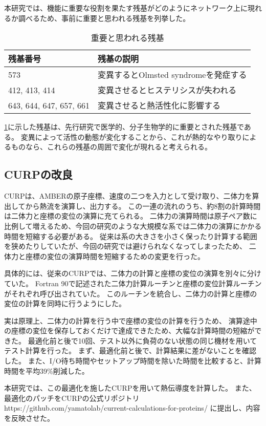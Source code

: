 本研究では、機能に重要な役割を果たす残基がどのようにネットワーク上に現れるか調べるため、事前に重要と思われる残基を列挙した。

\begin{table}[!ht]
  \centering
  \caption{重要と思われる残基}
  \begin{tabular}{ll}
  \hline
      残基番号                & 残基の説明            \\
      \hline
      573                     & 変異するとOlmsted syndromeを発症する\autocite{lin_exome_2012,lai-cheong_recurrent_2012,nilius_trpv_2013} \\
      412, 413, 414           & 変異させるとヒステリシスが失われる\autocite{liu_single-residue_2017} \\
      643, 644, 647, 657, 661 & 変異させると熱活性化に影響する\autocite{grandl_pore_2008} \\
  \end{tabular}
  \label{tab:important_residues}
\end{table}

\ref{tab:important_residues}に示した残基は、先行研究で医学的、分子生物学的に重要とされた残基である。
変異によって活性の動態が変化することから、これが熱的なやり取りによるものなら、これらの残基の周囲で変化が現れると考えられる。

\subsection{CURPの改良}\label{sec:curp}

CURPは、AMBERの原子座標、速度の二つを入力として受け取り、二体力を算出してから熱流を演算し、出力する。
この一連の流れのうち、約8割の計算時間は二体力と座標の変位の演算に充てられる。
二体力の演算時間は原子ペア数に比例して増えるため、今回の研究のような大規模な系では二体力の演算にかかる時間を短縮する必要がある。
従来は系の大きさを小さく保ったり計算する範囲を狭めたりしていたが、今回の研究では避けられなくなってしまったため、
二体力と座標の変位の演算時間を短縮するための変更を行った。

具体的には、従来のCURPでは、二体力の計算と座標の変位の演算を別々に分けていた。
Fortran 90で記述された二体力計算ルーチンと座標の変位計算ルーチンがそれぞれ呼び出されていた。
このルーチンを統合し、二体力の計算と座標の変位の計算を同時に行うようにした。

実は原理上、二体力の計算を行う中で座標の変位の計算を行うため、
演算途中の座標の変位を保存しておくだけで達成できたため、大幅な計算時間の短縮ができた。
最適化前と後で10回、テスト以外に負荷のない状態の同じ機材を用いてテスト計算を行った。
まず、最適化前と後で、計算結果に差がないことを確認した。
また、I/O待ち時間やセットアップ時間を除いた時間を比較すると、計算時間を平均39\%削減した。

本研究では、この最適化を施したCURPを用いて熱伝導度を計算した。
また、最適化のパッチをCURPの公式リポジトリ https://github.com/yamatolab/current-calculations-for-proteins/ に提出し、内容を反映させた。
